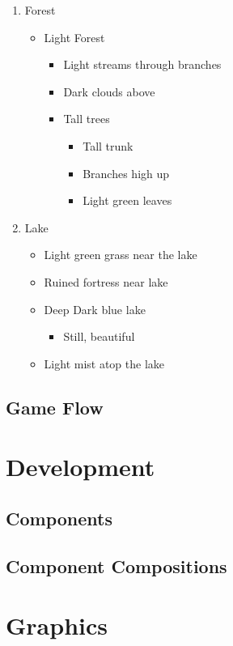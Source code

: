 \documentclass[letterpaper, twoside, 12pt]{memoir}
\begin{document}
\begin{enumerate}
\item Forest
\begin{itemize}
	\item Light Forest
	\begin{itemize}
		\item Light streams through branches
		\item Dark clouds above
		\item Tall trees
		\begin{itemize}
			\item Tall trunk
			\item Branches high up
			\item Light green leaves
		\end{itemize}
	\end{itemize}
\end{itemize}
\item Lake
\begin{itemize}
	\item Light green grass near the lake
	\item Ruined fortress near lake
	\item Deep Dark blue lake
	\begin{itemize}
		\item Still, beautiful
	\end{itemize}
	\item Light mist atop the lake
\end{itemize}
\end{enumerate}

\section{Game Flow}

\chapter{Development}
\section{Components}
\section{Component Compositions}

\chapter{Graphics}
\end{document}
